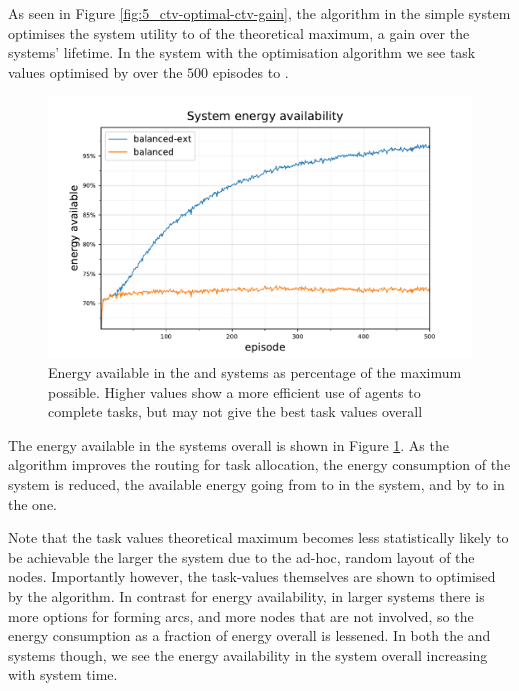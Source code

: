 As seen in Figure \ref{fig:5_ctv-optimal-ctv-gain}, the \algorithmBalanced{}{} algorithm in the simple system optimises the system utility to \resultsCTVBalancedEnd{}{} of the theoretical maximum, a \resultsCTVBalancedDiff{}{} gain over the systems' lifetime. In the \simulationExtended{}{} system with the \algorithmBalancedExt{}{} optimisation algorithm we see task values optimised by \resultsCTVBalancedExtDiff{}{} over the $500$ episodes to \resultsCTVBalancedExtEnd{}{}.
\begin{figure}[ht]
	\centering
	\includegraphics[width=0.7\linewidth]{5balanced_ctv-statistics-energy-available}
	\captionsetup{labelfont=bf,singlelinecheck=on}
	\caption{Energy available in the \simulationSimple{}{} and \simulationExtended{}{} systems as percentage of the maximum possible. Higher values show a more efficient use of agents to complete tasks, but may not give the best task values overall}
	\label{fig:ctv-statistics-energy-available}
\end{figure}
The energy available in the systems overall is shown in Figure \ref{fig:ctv-statistics-energy-available}. As the algorithm improves the routing for task allocation, the energy consumption of the system is reduced, the available energy going from \resultsEnergyBalancedStart{}{} to \resultsEnergyBalancedEnd{}{} in the \simulationSimple{}{} system, and by \resultsEnergyBalancedExtDiff{}{} to \resultsEnergyBalancedExtEnd{}{} in the \simulationExtended{}{} one.

Note that the task values theoretical maximum becomes less statistically likely to be achievable the larger the system due to the ad-hoc, random layout of the nodes. Importantly however, the task-values themselves are shown to optimised by the algorithm. In contrast for energy availability, in larger systems there is more options for forming arcs, and more nodes that are not involved, so the  energy consumption as a fraction of energy overall is lessened. In both the \simulationSimple{}{} and \simulationExtended{}{} systems though, we see the energy availability in the system overall increasing with system time.

